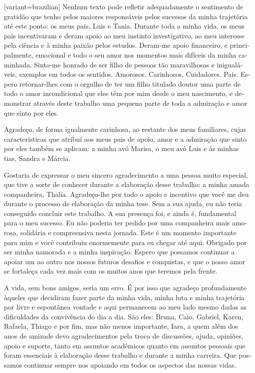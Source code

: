 \documentclass[12pt, twoside]{report}
\begin{document}
\begin{portuguese}[variant=brazilian]
  Nenhum texto pode refletir adequadamente o sentimento de gratidão que tenho pelos maiores responsáveis pelos sucessos da minha trajetória até este ponto: os meus pais, Luis e Tania. Durante toda a minha vida, os meus pais incentivaram e deram apoio ao meu instinto investigativo, ao meu interesse pela ciência e à minha paixão pelos estudos. Deram-me apoio financeiro, e principalmente, emocional e todo o seu amor nos momentos mais difíceis da minha caminhada. Sinto-me honrado de ser filho de pessoas tão maravilhosas e inigualáveis, exemplos em todos os sentidos. Amorosos. Carinhosos. Cuidadores. Pais. Espero retornar-lhes com o orgulho de ter um filho titulado doutor uma parte de todo o amor incondicional que eles têm por mim desde o meu nascimento, e demonstrar através deste trabalho uma pequena parte de toda a admiração e amor que sinto por eles.

  Agradeço, de forma igualmente carinhosa, ao restante dos meus familiares, cujas características que atribuí aos meus pais de apoio, amor e a admiração que sinto por eles também se aplicam: a minha avó Marisa, o meu avô Luis e às minhas tias, Sandra e Márcia.

  Gostaria de expressar o meu sincero agradecimento a uma pessoa muito especial, que tive a sorte de conhecer durante a elaboração desse trabalho: a minha amada companheira, Thalía. Agradeço-lhe por todo o apoio e incentivo que você me deu durante o processo de elaboração da minha tese. Sem a sua ajuda, eu não teria conseguido concluir este trabalho. A sua presença foi, e ainda é, fundamental para o meu sucesso. Eu não poderia ter pedido por uma companheira mais amorosa, solidária e compreensiva nesta jornada. Este é um momento importante para mim e você contribuiu enormemente para eu chegar até aqui. Obrigado por ser minha namorada e a minha inspiração. Espero que possamos continuar a apoiar um ao outro nos nossos futuros desafios e conquistas, e que o nosso amor se fortaleça cada vez mais com os muitos anos que teremos pela frente.

  A vida, sem bons amigos, seria um erro. É por isso que agradeço profundamente àqueles que decidiram fazer parte da minha vida, minha luta e minha trajetória por livre e espontânea vontade e aqui permanecem ao meu lado mesmo dadas as dificuldades da convivência do dia a dia. São eles: Bruna, Caio, Gabriel, Karen, Rafaela, Thiago e por fim, mas não menos importante, Iara, a quem além dos anos de amizade devo agradecimentos pela troca de discussões, ajuda, opiniões, apoio e suporte, tanto em assuntos acadêmicos quanto em assuntos pessoais que foram essenciais à elaboração desse trabalho e durante a minha carreira. Que possamos continuar sempre nos apoiando em todos os aspectos das nossas vidas.


\end{portuguese}
\end{document}
